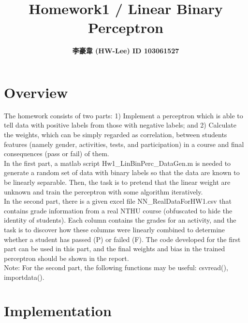 \documentclass[12pt]{article}
\title{\textbf{Homework1 / Linear Binary Perceptron}}
\author{\textbf{李豪韋 (HW-Lee) ID 103061527}}
\date{}
\begin{document}
\vspace*{-60pt}
    {\let\newpage\relax\maketitle}

\section*{Overview}
\vspace{-20pt}
\noindent\makebox[\linewidth]{\rule{\textwidth}{0.4pt}}
\vspace{5pt}

The homework consists of two parts: 1) Implement a perceptron which is able to tell data with positive labels from those with negative labels; and 2) Calculate the weights, which can be simply regarded as correlation, between students features (namely gender, activities, tests, and participation) in a course and final consequences (pass or fail) of them. \\

In the first part, a matlab script Hw1\_LinBinPerc\_DataGen.m is needed to generate a random set of data with binary labels so that the data are known to be linearly separable. Then, the task is to pretend that the linear weight are unknown and train the perceptron with some algorithm iteratively. \\

In the second part, there is a given excel file NN\_RealDataForHW1.csv that contains grade information from a real NTHU course (obfuscated to hide the identity of students). Each column contains the grades for an activity, and the task is to discover how these columns were linearly combined to determine whether a student has passed (P) or failed (F). The code developed for the first part can be used in this part, and the final weights and bias in the trained perceptron should be shown in the report. \\

Note: For the second part, the following functions may be useful: csvread(), importdata(). \\

\section*{Implementation}
\vspace{-20pt}
\noindent\makebox[\linewidth]{\rule{\textwidth}{0.4pt}}
\vspace{5pt}
\end{document}
